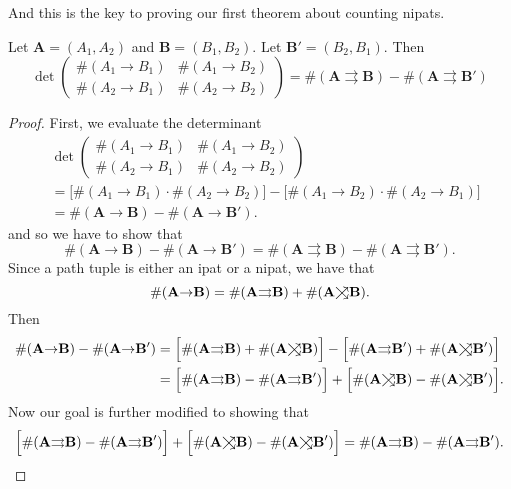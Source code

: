 \documentclass{article}
\newcommand\toea{\mathrel{\ooalign{$\nearrow$\cr$\searrow$\cr}}}
\newcommand\toto{\rightrightarrows}
\begin{document}
And this is the key to proving our first theorem about counting nipats.

\begin{theorem}[Lindstr\"om-Gessel-Viennot for lattice paths, $k=2$] 
    Let $\mathbf{A} = (A_1,A_2)$ and $\mathbf{B}=(B_1,B_2)$. Let $\mathbf{B}' = (B_2, B_1)$. Then
    \[
        \det \begin{pmatrix}
            \#(A_1{\to}B_1) & \#(A_1{\to}B_2) \\
            \#(A_2{\to}B_1) & \#(A_2{\to}B_2)
        \end{pmatrix} = \#(\mathbf{A}{\toto}\mathbf{B}) - \#(\mathbf{A}{\toto}\mathbf{B}')
    \]
\end{theorem}

\begin{proof}
    First, we evaluate the determinant
    \begin{align*}
        &\det \begin{pmatrix}
            \#(A_1{\to}B_1) & \#(A_1{\to}B_2) \\
            \#(A_2{\to}B_1) & \#(A_2{\to}B_2)
        \end{pmatrix} \\
        &= \Big[\#(A_1{\to}B_1) \cdot \#(A_2{\to}B_2)\Big] - \Big[\#(A_1{\to}B_2)\cdot\#(A_2{\to}B_1)\Big] \\
        &= \#(\mathbf{A}{\to}\mathbf{B}) - \#(\mathbf{A}{\to}\mathbf{B}').
    \end{align*}
    and so we have to show that
    \[
        \#(\mathbf{A}{\to}\mathbf{B}) - \#(\mathbf{A}{\to}\mathbf{B}') = \#(\mathbf{A}{\toto}\mathbf{B}) - \#(\mathbf{A}{\toto}\mathbf{B}').
    \]
    Since a path tuple is either an ipat or a nipat, we have that
    \[
        \#(\mathbf{A}{\to}\mathbf{B}) = \#(\mathbf{A}{\toto}\mathbf{B}) + \#(\mathbf{A}{\toea}\mathbf{B}).
    \]
    Then
    \begin{align*}
        \#(\mathbf{A}{\to}\mathbf{B}) - \#(\mathbf{A}{\to}\mathbf{B}') &= \Big[\#(\mathbf{A}{\toto}\mathbf{B}) + \#(\mathbf{A}{\toea}\mathbf{B})\Big] - \Big[\#(\mathbf{A}{\toto}\mathbf{B'}) + \#(\mathbf{A}{\toea}\mathbf{B'})\Big] \\
                                                                       &= \Big[\#(\mathbf{A}{\toto}\mathbf{B}) - \#(\mathbf{A}{\toto}\mathbf{B'})\Big] + \Big[\#(\mathbf{A}{\toea}\mathbf{B}) - \#(\mathbf{A}{\toea}\mathbf{B'})\Big].
    \end{align*}
    Now our goal is further modified to showing that
    \[
        \Big[\#(\mathbf{A}{\toto}\mathbf{B}) - \#(\mathbf{A}{\toto}\mathbf{B'})\Big] + \Big[\#(\mathbf{A}{\toea}\mathbf{B}) - \#(\mathbf{A}{\toea}\mathbf{B'})\Big] = \#(\mathbf{A}{\toto}\mathbf{B}) - \#(\mathbf{A}{\toto}\mathbf{B}').
\]
\end{proof}
\end{document}
